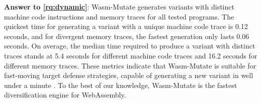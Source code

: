 \documentclass[a4paper,fleqn]{cas-dc}
\newcommand{\tool}{{\sc Wasm-Mutate}\xspace}
\newcommand{\Wasm}{WebAssembly\xspace}
\newcommand{\wasm}{\Wasm}
\begin{document}
\begin{tcolorbox}[boxrule=1pt,arc=.3em,boxsep=-1.3mm]
  \textbf{Answer to \ref{rq:dynamic}}: \tool generates variants with distinct machine code instructions and memory traces for all tested programs. 
  The quickest time for generating a variant with a unique machine code trace is 0.12 seconds, and for divergent memory traces, the fastest generation only lasts 0.06 seconds. 
  On average, the median time required to produce a variant with distinct traces stands at 5.4 seconds for different machine code traces and 16.2 seconds for different memory traces. 
  These metrics indicate that \tool is suitable for fast-moving target defense strategies, capable of generating a new variant in well under a minute \cite{MEWE}. To the best of our knowledge, \tool is the fastest diversification engine for \wasm.
\end{tcolorbox}
\end{document}
